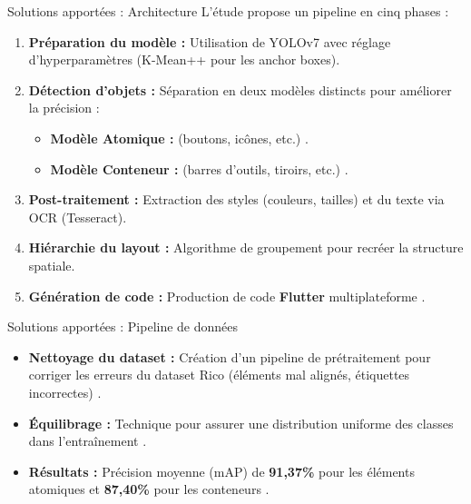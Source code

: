 \documentclass{beamer}
\begin{document}
\begin{frame}{Solutions apportées : Architecture}
    L'étude propose un pipeline en cinq phases  :
    \begin{enumerate}
        \item \textbf{Préparation du modèle :} Utilisation de YOLOv7 avec réglage d'hyperparamètres (K-Mean++ pour les anchor boxes).
        \item \textbf{Détection d'objets :} Séparation en deux modèles distincts pour améliorer la précision :
            \begin{itemize}
                \item \textbf{Modèle Atomique :} (boutons, icônes, etc.) .
                \item \textbf{Modèle Conteneur :} (barres d'outils, tiroirs, etc.) .
            \end{itemize}
        \item \textbf{Post-traitement :} Extraction des styles (couleurs, tailles) et du texte via OCR (Tesseract).
        \item \textbf{Hiérarchie du layout :} Algorithme de groupement pour recréer la structure spatiale.
        \item \textbf{Génération de code :} Production de code \textbf{Flutter} multiplateforme .
    \end{enumerate}
\end{frame}

\begin{frame}{Solutions apportées : Pipeline de données}
    \begin{itemize}
        \item \textbf{Nettoyage du dataset :} Création d'un pipeline de prétraitement pour corriger les erreurs du dataset Rico (éléments mal alignés, étiquettes incorrectes) .
        \item \textbf{Équilibrage :} Technique pour assurer une distribution uniforme des classes dans l'entraînement .
        \item \textbf{Résultats :} Précision moyenne (mAP) de \textbf{91,37\%} pour les éléments atomiques et \textbf{87,40\%} pour les conteneurs .
    \end{itemize}
\end{frame}
\end{document}
